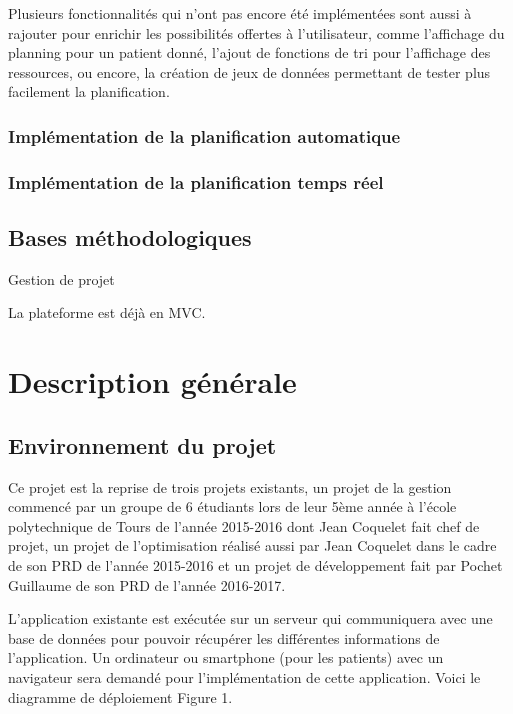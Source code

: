 \documentclass{polytech/polytech}
\begin{document}
Plusieurs fonctionnalités qui n'ont pas encore été implémentées sont aussi à rajouter pour enrichir les possibilités offertes à l'utilisateur, comme l'affichage du planning pour un patient donné, l'ajout de fonctions de tri pour l'affichage des ressources, ou encore, la création de jeux de données permettant de tester plus facilement la planification. 


\subsection{Implémentation de la planification automatique}


\subsection{Implémentation de la planification temps réel}



\section{Bases méthodologiques}


Gestion de projet


La plateforme est déjà en MVC.


\chapter{Description générale}


\section{Environnement du projet}


Ce projet est la reprise de trois projets existants, un projet de la gestion commencé par un groupe de 6 étudiants lors de leur 5ème année à l'école polytechnique de Tours de l'année 2015-2016 dont Jean Coquelet fait chef de projet, un projet de l'optimisation réalisé aussi par Jean Coquelet dans le cadre de son PRD de l'année 2015-2016 et un projet de développement fait par Pochet Guillaume de son PRD de l'année 2016-2017.

L'application existante est exécutée sur un serveur qui communiquera avec une base de données pour pouvoir récupérer les différentes informations de l'application. Un ordinateur ou smartphone (pour les patients) avec un navigateur sera demandé pour l'implémentation de cette application. Voici le diagramme de déploiement Figure 1. 
\end{document}
